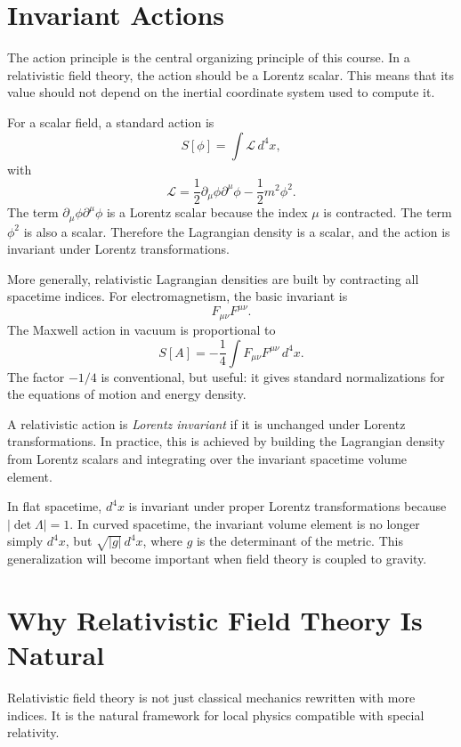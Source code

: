 \section{Invariant Actions}

The action principle is the central organizing principle of this course. In a
relativistic field theory, the action should be a Lorentz scalar. This means
that its value should not depend on the inertial coordinate system used to
compute it.

For a scalar field, a standard action is
\[
    S[\phi]=\int \mathcal{L}\,d^4x,
\]
with
\[
    \mathcal{L}
    = \frac{1}{2}\partial_\mu\phi\partial^\mu\phi
      -\frac{1}{2}m^2\phi^2.
\]
The term \(\partial_\mu\phi\partial^\mu\phi\) is a Lorentz scalar because the
index \(\mu\) is contracted. The term \(\phi^2\) is also a scalar. Therefore the
Lagrangian density is a scalar, and the action is invariant under Lorentz
transformations.

More generally, relativistic Lagrangian densities are built by contracting all
spacetime indices. For electromagnetism, the basic invariant is
\[
    F_{\mu\nu}F^{\mu\nu}.
\]
The Maxwell action in vacuum is proportional to
\[
    S[A]= -\frac{1}{4}\int F_{\mu\nu}F^{\mu\nu}\,d^4x.
\]
The factor \(-1/4\) is conventional, but useful: it gives standard normalizations
for the equations of motion and energy density.

\begin{definitionbox}
A relativistic action is \emph{Lorentz invariant} if it is unchanged under
Lorentz transformations. In practice, this is achieved by building the
Lagrangian density from Lorentz scalars and integrating over the invariant
spacetime volume element.
\end{definitionbox}

In flat spacetime, \(d^4x\) is invariant under proper Lorentz transformations
because \(|\det\Lambda|=1\). In curved spacetime, the invariant volume element
is no longer simply \(d^4x\), but \(\sqrt{|g|}\,d^4x\), where \(g\) is the
determinant of the metric. This generalization will become important when field
theory is coupled to gravity.

\section{Why Relativistic Field Theory Is Natural}

Relativistic field theory is not just classical mechanics rewritten with more
indices. It is the natural framework for local physics compatible with special
relativity.


